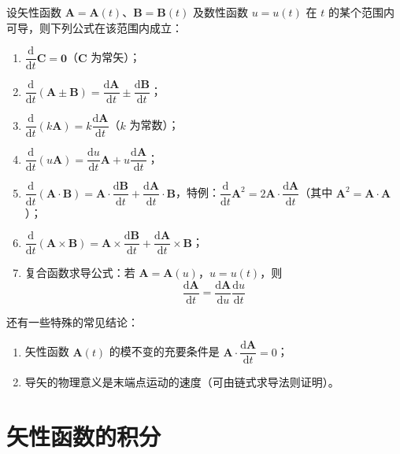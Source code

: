 设矢性函数 $\boldsymbol{A}=\boldsymbol{A}(t)$、$\boldsymbol{B}=\boldsymbol{B}(t)$ 及数性函数 $u=u(t)$ 在 $t$ 的某个范围内可导，则下列公式在该范围内成立：
\begin{enumerate}
	\item $\dfrac{\mathrm{d}}{\mathrm{d}t}\boldsymbol{C}=\mathbf{0}$（$\boldsymbol{C}$ 为常矢）；
	\item $\dfrac{\mathrm{d}}{\mathrm{d}t}(\boldsymbol{A}\pm\boldsymbol{B})=\dfrac{\mathrm{d}\boldsymbol{A}}{\mathrm{d}t}\pm\dfrac{\mathrm{d}\boldsymbol{B}}{\mathrm{d}t}$；
	\item $\dfrac{\mathrm{d}}{\mathrm{d}t}(k\boldsymbol{A})=k\dfrac{\mathrm{d}\boldsymbol{A}}{\mathrm{d}t}$（$k$ 为常数）；
	\item $\dfrac{\mathrm{d}}{\mathrm{d}t}(u\boldsymbol{A})=\dfrac{\mathrm{d}u}{\mathrm{d}t}\boldsymbol{A}+u\dfrac{\mathrm{d}\boldsymbol{A}}{\mathrm{d}t}$；
	\item $\dfrac{\mathrm{d}}{\mathrm{d}t}(\boldsymbol{A}\cdot\boldsymbol{B})=\boldsymbol{A}\cdot\dfrac{\mathrm{d}\boldsymbol{B}}{\mathrm{d}t}+\dfrac{\mathrm{d}\boldsymbol{A}}{\mathrm{d}t}\cdot\boldsymbol{B}$，特例：$\dfrac{\mathrm{d}}{\mathrm{d}t}\boldsymbol{A}^{2}=2\boldsymbol{A}\cdot\dfrac{\mathrm{d}\boldsymbol{A}}{\mathrm{d}t}$（其中 $\boldsymbol{A}^{2}=\boldsymbol{A}\cdot\boldsymbol{A}$）；
	\item $\dfrac{\mathrm{d}}{\mathrm{d}t}(\boldsymbol{A}\times\boldsymbol{B})=\boldsymbol{A}\times\dfrac{\mathrm{d}\boldsymbol{B}}{\mathrm{d}t}+\dfrac{\mathrm{d}\boldsymbol{A}}{\mathrm{d}t}\times\boldsymbol{B}$；
	\item 复合函数求导公式：若 $\boldsymbol{A}=\boldsymbol{A}(u)$，$u=u(t)$，则
		\begin{equation}
			\label{eq:导数公式:复合函数}
			\frac{\mathrm{d}\boldsymbol{A}}{\mathrm{d}t}
			=\frac{\mathrm{d}\boldsymbol{A}}{\mathrm{d}u}\frac{\mathrm{d}u}{\mathrm{d}t}
		\end{equation}
\end{enumerate}

还有一些特殊的常见结论：
\begin{enumerate}
	\item 矢性函数 $\boldsymbol{A}(t)$ 的模不变的充要条件是 $\boldsymbol{A}\cdot\dfrac{\mathrm{d}\boldsymbol{A}}{\mathrm{d}t}=0$；
	\item 导矢的物理意义是末端点运动的速度（可由链式求导法则证明）。
\end{enumerate}

\section{矢性函数的积分}

